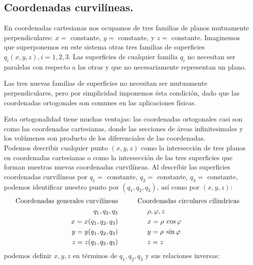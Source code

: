\subsection{Coordenadas curvilíneas.}
En coordenadas cartesianas nos ocupamos de tres familias de planos mutuamente perpendiculares: $x = \mbox{ constante}$, $y = \mbox{ constante}$, y $z = \mbox{ constante}$. Imaginemos que superponemos en este sistema otras tres familias de superficies $q_{i} (x, y, z), i = 1,2,3$. Las superficies de cualquier familia $q_{i}$ no necesitan ser paralelas con respecto a las otras  y que no necesariamente representan un plano.
\par
Las tres nuevas familias de superficies no necesitan ser mutuamente perpendiculares, pero por simplicidad imponemos ésta condición, dado que las coordenadas ortogonales son comunes en las aplicaciones físicas.
\par
Esta ortogonalidad tiene muchas ventajas: las coordenadas ortogonales casi son como las coordenadas cartesianas, donde las secciones de áreas infinitesimales y los volúmenes son producto de los diferenciales de las coordenadas.
\\
Podemos describir cualquier punto $(x, y, z)$ como la intersección de tres planos en coordenadas cartesianas o como la intersección de las tres superficies que forman nuestras nuevas coordenadas curvilíneas. Al describir las superficies coordenadas curvilíneas por $q_{1} = \mbox{ constante}$, $q_{2} = \mbox{ constante}$, $q_{3} = \mbox{ constante}$, podemos identificar nuestro punto por $(q_{1}, q_{2}, q_{3})$, así como por $(x, y, z)$:
\begin{align}
\begin{aligned}
\mbox{Coordenadas  generales curvilíneas} & \hspace{1.cm} \mbox{Coordenadas circulares cilíndricas} \\
q_{1}, q_{2}, q_{3} & \hspace{1.5cm} \rho, \varphi, z \\ 
x = x(q_{1},q_{2}, q_{3}) & \hspace{1.5cm} x = \rho \: \cos \varphi \\ 
y = y(q_{1},q_{2}, q_{3}) & \hspace{1.5cm} y = \rho \: \sin \varphi \\
z = z(q_{1},q_{2}, q_{3}) & \hspace{1.5cm} z = z
\label{eq:ecuacion_02_02}
\end{aligned}
\end{align}
podemos definir $x, y, z$ en términos de $q_{1}, q_{2}, q_{3}$ y sus relaciones inversas:
